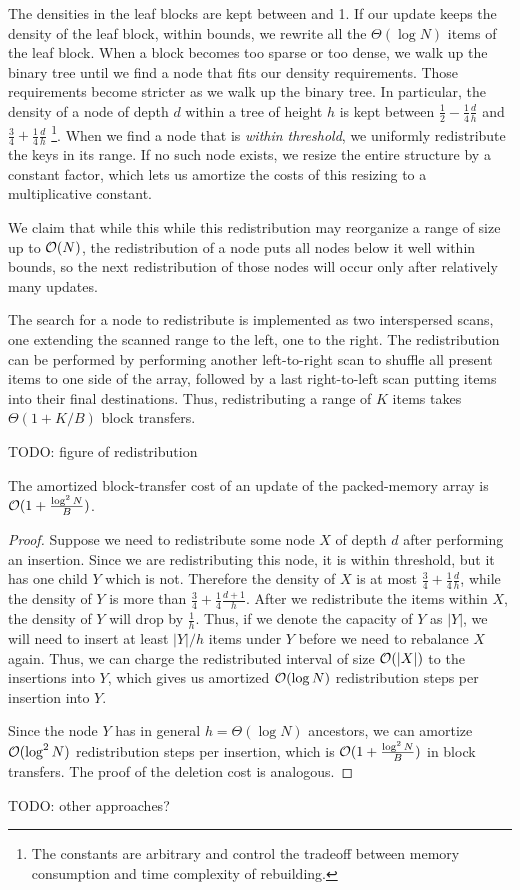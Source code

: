 The densities in the leaf blocks are kept between  %
and 1. If our update keeps the density of the leaf block, within bounds,
we rewrite all the $\Theta(\log N)$ items of the leaf block.
When a block becomes too sparse or too dense, we walk up the binary
tree until we find a node that fits our density requirements.
Those requirements become stricter as we walk up the binary tree.
In particular, the density of a node of depth $d$ within a tree of height $h$
is kept between $\frac{1}{2}-\frac{1}{4}\frac{d}{h}$ and $\frac{3}{4}+\frac{1}{4}\frac{d}{h}$
\footnote{The constants are arbitrary and control the tradeoff
between memory consumption and time complexity of rebuilding.}.
When we find a node that is \textit{within threshold}, we uniformly redistribute
the keys in its range. If no such node exists, we resize the entire structure
by a constant factor, which lets us amortize the costs of this resizing to
a multiplicative constant.

We claim that while this while this redistribution may reorganize a range
of size up to $\mathcal{O}(N)$, the redistribution of a node puts all nodes below it
well within bounds, so the next redistribution of those nodes will occur
only after relatively many updates. %

The search for a node to redistribute is implemented as two interspersed scans,
one extending the scanned range to the left, one to the right. The
redistribution can be performed by performing another left-to-right scan to
shuffle all present items to one side of the array, followed by a last
right-to-left scan putting items into their final destinations. Thus,
redistributing a range of $K$ items takes $\Theta(1+K/B)$ block transfers.

TODO: figure of redistribution

\begin{theorem}
The amortized block-transfer cost of an update of the packed-memory array
is $\mathcal{O}(1+\frac{\log^2 N}{B})$.
\end{theorem}

\begin{proof}
Suppose we need to redistribute some node $X$ of depth $d$ after performing
an insertion. Since we are redistributing this node, it is within threshold,
but it has one child $Y$ which is not. Therefore the density of $X$ is at most
$\frac{3}{4}+\frac{1}{4}\frac{d}{h}$, while the density of $Y$ is more than
$\frac{3}{4}+\frac{1}{4}\frac{d+1}{h}$. After we redistribute the items within $X$,
the density of $Y$ will drop by $\frac{1}{h}$. Thus, if we denote the capacity
of $Y$ as $|Y|$, we will need to insert at least $|Y|/h$ items under $Y$ before
we need to rebalance $X$ again. Thus, we can charge the redistributed interval
of size $\mathcal{O}(|X|)$ to the insertions into $Y$, which gives us amortized $\mathcal{O}(\log N)$
redistribution steps per insertion into $Y$.

Since the node $Y$ has in general $h=\Theta(\log N)$ ancestors, we can amortize
$\mathcal{O}(\log^2 N)$ redistribution steps per insertion, which is
$\mathcal{O}(1+\frac{\log^2 N}{B})$ in block transfers. The proof of the deletion
cost is analogous.
\end{proof}

TODO: other approaches?
